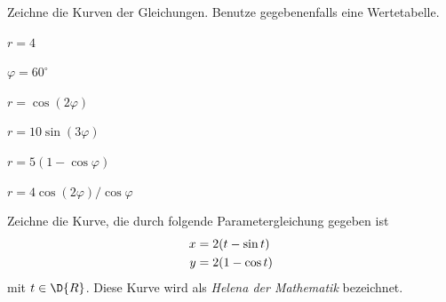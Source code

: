 \documentclass[%
11pt,%
twoside,%
titlepage,%
german,%
headsepline%
]{scrartcl}
\begin{document}
\begin{ueb}
Zeichne die Kurven der Gleichungen. Benutze gegebenenfalls eine Wertetabelle.

  \begin{minipage}{3.5cm}
    \begin{enumeratea}
      \item $r=4$
      \item $\varphi=60^\circ$
      \item $r=\cos(2\varphi)$
    \end{enumeratea}
  \end{minipage}
  \begin{minipage}{4cm}
    \begin{enumeratea}\addtocounter{enumi}{3}
      \item $r=10\sin(3\varphi)$
      \item $r=5(1-\cos\varphi)$
      \item $r=4\cos(2\varphi)/\cos\varphi$
    \end{enumeratea}
  \end{minipage}
\end{ueb}

\begin{ueb}
Zeichne die Kurve, die durch folgende Parametergleichung gegeben ist
\begin{align}
x&=2(t-\sin t)\notag\\
y&=2(1-\cos t)\notag
\end{align}
mit $t\in\D{R}$.
Diese Kurve wird als \emph{Helena der Mathematik} bezeichnet.
\end{ueb}

\clearpage
\listoffigures
%
%
\end{document}
